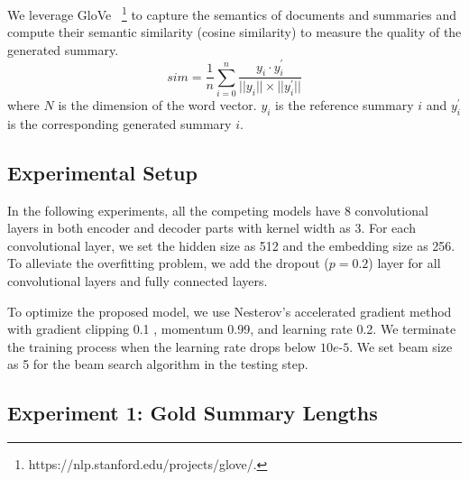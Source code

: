 We leverage GloVe ~\footnote{https://nlp.stanford.edu/projects/glove/.}  
to capture the semantics of documents and summaries
and compute their semantic similarity (cosine similarity) to
measure the quality of the generated summary.
\begin{equation}
sim = \frac{1}{n}\sum_{i=0}^{n} \frac{y_{i}\cdot y^{'}_{i}}{||y_{i}||\times ||y^{'}_{i}||}
\end{equation}
where $N$ is the dimension of the word vector. $y_i$ is
the reference summary $i$ and $y^{'}_{i}$ is the corresponding generated summary $i$. 



\subsection{Experimental Setup}
In the following experiments, 
all the competing models have 8 convolutional layers in
both encoder and decoder parts with kernel width as 3.
For each convolutional layer, 
we set the hidden size as 512 and the embedding size as 256.
To alleviate the overfitting problem,
we add the dropout ($p=0.2$) layer for 
all convolutional layers and fully connected layers.

To optimize the proposed model,
we use Nesterov's
accelerated gradient method \cite{SutskeverMDH13} with gradient clipping 0.1 \cite{PascanuMB13}, momentum 0.99,
and learning rate 0.2.
We terminate the training process when the learning rate drops below $10e$-$5$.
We set beam size as 5 for the beam search algorithm in the testing step.
%
%

\subsection{Experiment 1: Gold Summary Lengths}
\label{sec:exp1}

